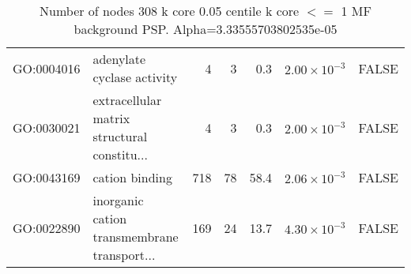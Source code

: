 \begin{table}[ht]
\begin{adjustbox}{width=\textwidth}
\begin{tabular}{llrrrrl}
  GO:0004016 & adenylate cyclase activity & 4 & 3 & 0.3 & $2.00 \times 10^{-3}$ & FALSE \\ 
  GO:0030021 & extracellular matrix structural constitu... & 4 & 3 & 0.3 & $2.00 \times 10^{-3}$ & FALSE \\ 
  GO:0043169 & cation binding & 718 & 78 & 58.4 & $2.06 \times 10^{-3}$ & FALSE \\ 
  GO:0022890 & inorganic cation transmembrane transport... & 169 & 24 & 13.7 & $4.30 \times 10^{-3}$ & FALSE \\ 
   \hline
\end{tabular}
\end{adjustbox}
\caption{Number of nodes 308 k core 0.05 centile  k core $<=$ 1 MF background PSP. Alpha=3.33555703802535e-05} 
\label{tab:Number of nodes 308 k core 0.05 centile  k core $<=$ 1 MF background PSP. Alpha=3.33555703802535e-05}
\end{table}


